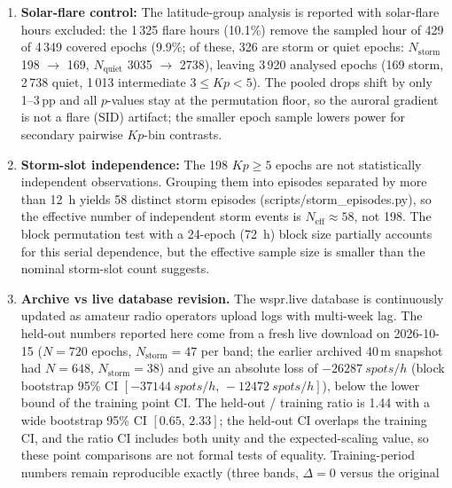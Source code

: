 \documentclass{agujournal2019}
\begin{document}
\begin{enumerate}
	      full 507/8214 hours. Reported means are per sampled hour;
	      extrapolation to full 3-hour epochs is not claimed. The drop\%
	      ratio is invariant to this sampling because storm and quiet
	      windows are sampled identically.
	\item \textbf{Solar-flare control:} The latitude-group
	      analysis is reported with solar-flare hours excluded: the
	      1\,325 flare hours (10.1\%) remove the sampled hour of 429 of
	      4\,349 covered epochs (9.9\%; of these, 326 are storm or quiet
	      epochs: $N_{\text{storm}}$ 198 $\rightarrow$ 169,
	      $N_{\text{quiet}}$ 3035 $\rightarrow$ 2738), leaving 3\,920
	      analysed epochs (169 storm, 2\,738 quiet, 1\,013 intermediate
	      $3 \le Kp < 5$). The pooled drops shift by only 1--3\,pp and all
	      $p$-values stay at the permutation floor, so the auroral gradient
	      is not a flare (SID) artifact; the smaller epoch sample lowers
	      power for secondary pairwise $Kp$-bin contrasts.
	\item \textbf{Storm-slot independence:} The 198 $Kp \ge 5$
	      epochs are not statistically independent observations. Grouping
	      them into episodes separated by more than 12~h yields 58 distinct
	      storm episodes (scripts/storm\_episodes.py), so the effective
	      number of independent storm events is $N_{\text{eff}} \approx 58$,
	      not 198. The block permutation test with a 24-epoch (72~h) block size partially
	      accounts for this serial dependence, but the effective sample size
	      is smaller than the nominal storm-slot count suggests.
	\item \textbf{Archive vs live database revision.} The wspr.live
	      database is continuously updated as amateur radio operators
	      upload logs with multi-week lag. The held-out numbers reported
	      here come from a fresh live download on 2026-10-15 ($N = 720$
	      epochs, $N_{\text{storm}} = 47$ per band; the earlier archived
	      40\,m snapshot had $N = 648$, $N_{\text{storm}} = 38$) and give an
	      absolute loss of
	      $\SI{-26287}{spots/h}$ (block bootstrap 95\% CI
	      $[-\SI{37144}{spots/h},\, -\SI{12472}{spots/h}]$), below
	      the lower bound of the training point CI. The held-out / training
	      ratio is 1.44 with a wide bootstrap 95\% CI
	      $[0.65,\, 2.33]$; the held-out CI overlaps the training CI, and
	      the ratio CI includes both unity and the expected-scaling value,
	      so these point comparisons are not formal tests of equality.
	      Training-period numbers remain
	      reproducible exactly (three bands, $\Delta = 0$ versus the original

\end{enumerate}
\end{document}
